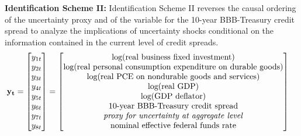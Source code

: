 \documentclass[a4paper,11pt,listof=nochaptergap,oneside,pointednumbers,bibtotoc,bigheadings,liststotoc,hidelinks]{scrbook}
\theoremstyle{mysatz}
\theoremstyle{mydefinition}
\theoremstyle{mytheorem}
\theoremstyle{mybemerkung}
\newcommand{\vect}[1]{\boldsymbol{\mathbf{#1}}}
\begin{document}
\textbf{Identification Scheme II:}      
Identification Scheme II reverses the causal ordering of the uncertainty proxy and of the variable for the 10-year BBB-Treasury credit spread to analyze the implications of uncertainty shocks conditional on the information contained in the current level of credit spreads.
\begin{equation} \label{eq:VAR21}
\begin{split}
\vect{y_t} & = 
 \begin{bmatrix} 
 		y_{1t} \\
		y_{2t} \\
		y_{3t} \\
		y_{4t} \\
		y_{5t} \\
		y_{6t} \\
		y_{7t} \\
		y_{8t} 
	      \end{bmatrix} = 	      
	      \begin{bmatrix} \text{log(real business fixed investment)} \\ 
				      \text{log(real personal consumption expenditure on durable goods)}\\ 
				      \text{log(real PCE on nondurable goods and services)}\\
				      \text{log(real GDP)}\\ 
				      \text{log(GDP deflator)}\\
				      \text{10-year BBB-Treasury credit spread}\\
				      \text{\textit{proxy for uncertainty at aggregate level}} \\
				      \text{nominal effective federal funds rate}
	      \end{bmatrix}
\end{split}
\end{equation}
\end{document}

